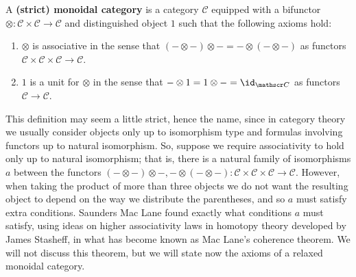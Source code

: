 A \textbf{(strict) monoidal category} is a category $\mathscr C$ equipped with a bifunctor $\otimes : \mathscr C \times \mathscr C \rightarrow \mathscr C$ and distinguished object $1$ such that the following axioms hold:
\begin{enumerate}
	\item $\otimes$ is associative in the sense that $(- \otimes -) \otimes - = - \otimes (- \otimes -)$ as functors $\mathscr C \times \mathscr C \times \mathscr C \rightarrow \mathscr C$.
	\item $1$ is a unit for $\otimes$ in the sense that $- \otimes 1 = 1 \otimes - = \id_{\mathscr C}$ as functors $\mathscr C \rightarrow \mathscr C$.
\end{enumerate}
This definition may seem a little strict, hence the name, since in category theory we usually consider objects only up to isomorphism type and formulas involving functors up to natural isomorphism. So, suppose we require associativity to hold only up to natural isomorphism; that is, there is a natural family of isomorphisms $a$ between the functors $(- \otimes -) \otimes -,- \otimes (- \otimes -) : \mathscr C \times \mathscr C \times \mathscr C \rightarrow \mathscr C$. However, when taking the product of more than three objects we do not want the resulting object to depend on the way we distribute the parentheses, and so $a$ must satisfy extra conditions. Saunders Mac Lane found exactly what conditions $a$ must satisfy, using ideas on higher associativity laws in homotopy theory developed by James Stasheff, in what has become known as Mac Lane's coherence theorem. We will not discuss this theorem, but we will state now the axioms of a relaxed monoidal category.

